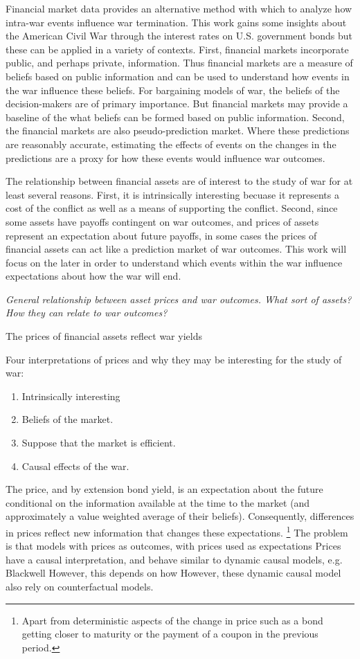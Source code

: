 Financial market data provides an alternative method with which to analyze how intra-war events influence war termination.
This work gains some insights about the American Civil War through the interest rates on U.S. government bonds but these can be applied in a variety of contexts.
First, financial markets incorporate public, and perhaps private, information.
Thus financial markets are a measure of beliefs based on public information and can be used to understand how events in the war influence these beliefs.
For bargaining models of war, the beliefs of the decision-makers are of primary importance.
But financial markets may provide a baseline of the what beliefs can be formed based on public information.
Second, the financial markets are also pseudo-prediction market.
Where these predictions are reasonably accurate, estimating the effects of events on the changes in the predictions are a proxy for how these events would influence war outcomes.

The relationship between financial assets are of interest to the study of war for at least several reasons.
First, it is intrinsically interesting becuase it represents a cost of the conflict as well as a means of supporting the conflict.
Second, since some assets have payoffs contingent on war outcomes, and prices of assets represent an expectation about future payoffs, in some cases the prices of financial assets can act like a prediction market of war outcomes.
This work will focus on the later in order to understand which events within the war influence expectations about how the war will end.



\textit{General relationship between asset prices and war outcomes. What sort of assets? How they can relate to war outcomes?}

The prices of financial assets reflect war yields 


Four interpretations of prices and why they may be interesting for the study of war:

\begin{enumerate}
\item Intrinsically interesting
\item Beliefs of the market.
\item Suppose that the market is efficient.
\item Causal effects of the war.
\end{enumerate}

The price, and by extension bond yield, is an expectation about the future conditional on the information available at the time to the market (and approximately a value weighted average of their beliefs).
Consequently, differences in prices reflect new information that changes these expectations.%
\footnote{Apart from deterministic aspects of the change in price such as a bond getting closer to maturity or the payment of a coupon in the previous period.}
The problem is that models with prices as outcomes, with prices used as expectations
Prices have a causal interpretation, and behave similar to dynamic causal models, e.g. Blackwell
However, this depends on how
However, these dynamic causal model also rely on counterfactual models.

